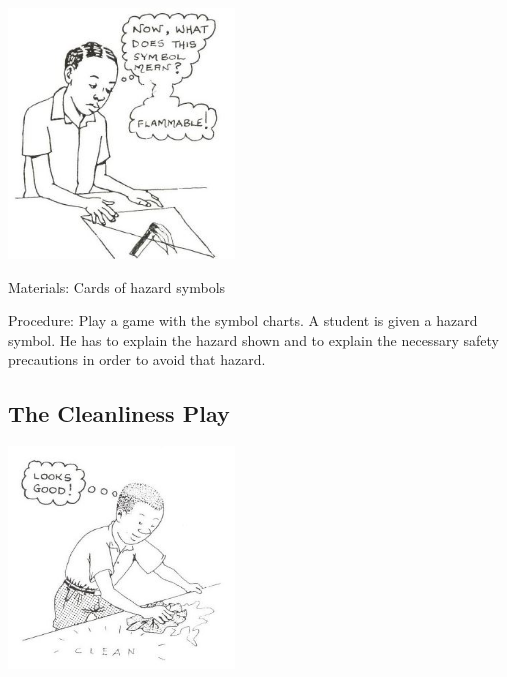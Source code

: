 \begin{multicols}{2}
\begin{center}
\includegraphics[width=0.45\textwidth]{./img/source/safety-game.jpg}
\end{center}

\begin{description*}
\item[Materials:]{Cards of hazard symbols}
\item[Procedure:]{Play a game with the symbol charts. A
student is given a hazard symbol. He has to
explain the hazard shown and to explain the
necessary safety precautions in order to avoid
that hazard.}
\end{description*}

\columnbreak

\subsection{The Cleanliness Play}

\begin{center}
\includegraphics[width=0.45\textwidth]{./img/source/cleanliness-play.jpg}
\end{center}


\end{multicols}
